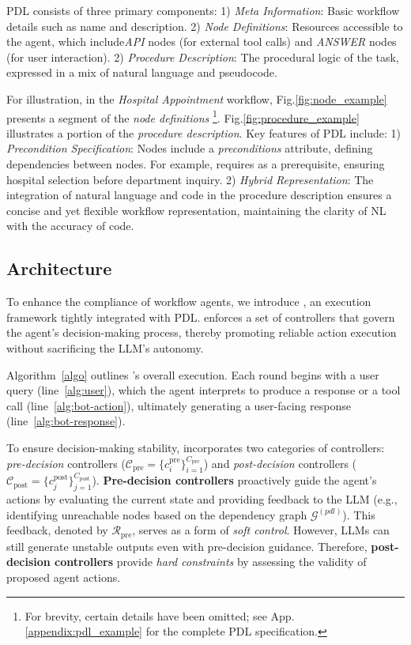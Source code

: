 PDL consists of three primary components:
1) \textit{Meta Information}: Basic workflow details such as name and description.
2) \textit{Node Definitions}: Resources accessible to the agent, which include\emph{API} nodes (for external tool calls) and \emph{ANSWER} nodes (for user interaction).
2) \textit{Procedure Description}: The procedural logic of the task, expressed in a mix of natural language and pseudocode.

For illustration, in the \emph{Hospital Appointment} workflow, Fig.\ref{fig:node_example} presents a segment of the \emph{node definitions}
\footnote{For brevity, certain details have been omitted; see App.\ref{appendix:pdl_example} for the complete PDL specification.}.
Fig.\ref{fig:procedure_example} illustrates a portion of the \emph{procedure description}.  Key features of PDL include:
1) \textit{Precondition Specification}: Nodes include a \emph{preconditions} attribute, defining dependencies between nodes. For example,  requires  as a prerequisite, ensuring hospital selection before department inquiry.
2) \textit{Hybrid Representation}: The integration of natural language and code in the procedure description ensures a concise and yet flexible workflow representation, maintaining the clarity of NL with the accuracy of code.

\algo

\subsection{\model Architecture} \label{subsec:arch}

To enhance the compliance of workflow agents, we introduce \model, an execution framework tightly integrated with PDL. \model enforces a set of controllers that govern the agent's decision-making process, thereby promoting reliable action execution without sacrificing the LLM's autonomy.

Algorithm~\ref{algo} outlines \model's overall execution. Each round begins with a user query (line~\ref{alg:user}), which the agent interprets to produce a response or a tool call (line~\ref{alg:bot-action}), ultimately generating a user-facing response (line~\ref{alg:bot-response}).

To ensure decision-making stability, \model incorporates two categories of controllers: \emph{pre-decision} controllers ($\mathcal{C}_{\text{pre}} = \{c^{\text{pre}}_i\}_{i=1}^{C_{\text{pre}}}$) and \emph{post-decision} controllers ($\mathcal{C}_{\text{post}} = \{c^{\text{post}}_j\}_{j=1}^{C_{\text{post}}}$).
\textbf{Pre-decision controllers} proactively guide the agent's actions by evaluating the current state and providing feedback to the LLM (e.g., identifying unreachable nodes based on the dependency graph $\mathcal{G}^{(pdl)}$). This feedback, denoted by $\mathcal{R}_{\text{pre}}$, serves as a form of \emph{soft control}.
However, LLMs can still generate unstable outputs even with pre-decision guidance. Therefore, \textbf{post-decision controllers} provide \emph{hard constraints} by assessing the validity of proposed agent actions.  

